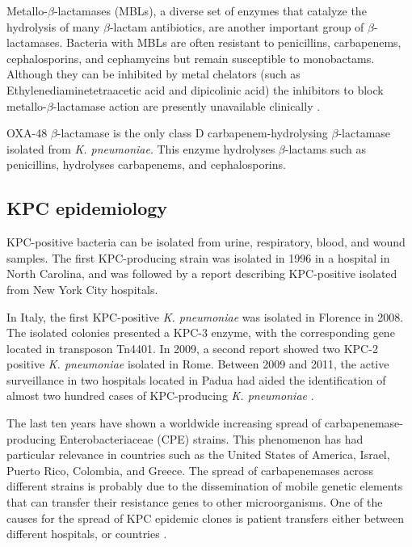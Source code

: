 \documentclass[11pt]{report}
\begin{document}
Metallo-$\beta$-lactamases (MBLs), a diverse set of enzymes that catalyze the hydrolysis of many $\beta$-lactam antibiotics, are another important group of $\beta$-lactamases.
Bacteria with MBLs are often resistant to penicillins, carbapenems, cephalosporins, and cephamycins but remain susceptible to monobactams.
Although they can be inhibited by metal chelators (such as Ethylenediaminetetraacetic acid and dipicolinic acid) the inhibitors to block metallo-$\beta$-lactamase action are presently unavailable clinically \cite{palzkill2013metallo}.

OXA-48 $\beta$-lactamase is the only class D carbapenem-hydrolysing $\beta$-lactamase isolated from \emph{K. pneumoniae}.
This enzyme hydrolyses $\beta$-lactams such as penicillins, hydrolyses carbapenems, and cephalosporins.


\subsection{KPC epidemiology}

KPC-positive bacteria can be isolated from urine, respiratory, blood, and wound samples.
The first KPC-producing strain was isolated in 1996 in a hospital in North Carolina, and was followed by a report describing KPC-positive isolated from New York City hospitals.

In Italy, the first KPC-positive \emph{K. pneumoniae} was isolated in Florence in 2008.
The isolated colonies presented a KPC-3 enzyme, with the corresponding gene located in transposon Tn4401.
In 2009, a second report showed two KPC-2 positive \emph{K. pneumoniae} isolated in Rome.
Between 2009 and 2011, the active surveillance in two hospitals located in Padua had aided the identification of almost two hundred cases of KPC-producing \emph{K. pneumoniae} \cite{MunozPrice2013}.

The last ten years have shown a worldwide increasing spread of carbapenemase-producing Enterobacteriaceae (CPE) strains.
This phenomenon has had particular relevance in countries such as the United States of America, Israel, Puerto Rico, Colombia, and Greece.
The spread of carbapenemases across different strains is probably due to the dissemination of mobile genetic elements that can transfer their resistance genes to other microorganisms.
One of the causes for the spread of KPC epidemic clones is patient transfers either between different hospitals, or countries \cite{circolare2013}.

\clearpage
\end{document}
